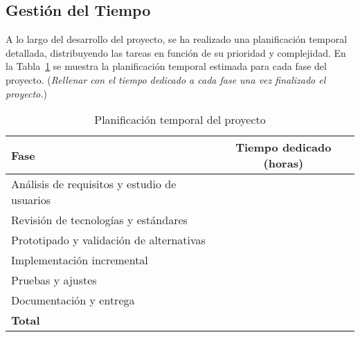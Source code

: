 \subsection{Gestión del Tiempo}

A lo largo del desarrollo del proyecto, se ha realizado una planificación temporal detallada, distribuyendo las tareas en función de su prioridad y complejidad. En la Tabla~\ref{tab:planificacion} se muestra la planificación temporal estimada para cada fase del proyecto. (\textit{Rellenar con el tiempo dedicado a cada fase una vez finalizado el proyecto.})

\begin{table}[H]
    \centering
    \begin{tabular}{|l|c|}
        \hline
        \textbf{Fase} & \textbf{Tiempo dedicado (horas)} \\
        \hline
        Análisis de requisitos y estudio de usuarios & \\
        Revisión de tecnologías y estándares & \\
        Prototipado y validación de alternativas & \\
        Implementación incremental & \\
        Pruebas y ajustes & \\
        Documentación y entrega & \\
        \hline
        \textbf{Total} & \\
        \hline
    \end{tabular}
    \caption{Planificación temporal del proyecto}
    \label{tab:planificacion}
\end{table}
